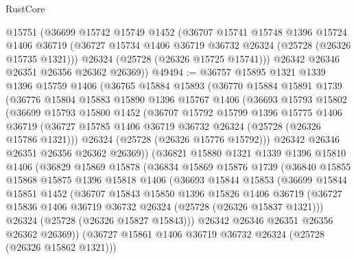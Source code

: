 \begin{lexlean}{RustCore}
\begin{coremodule}
      @15751
      (@36699
        @15742
        @15749
        @1452
        (@36707
          @15741
          @15748
          @1396
          @15724
          @1406
          @36719
          (@36727 @15734 @1406 @36719 @36732 @26324 (@25728 (@26326 @15735 @1321)))
          @26324
          (@25728 (@26326 @15725 @15741)))
        @26342
        @26346
        @26351
        @26356
        @26362
        @26369))
@49494 := @36757
    @15895
    @1321
    @1339
    @1396
    @15759
    @1406
    (@36765
      @15884
      @15893
      (@36770
        @15884
        @15891
        @1739
        (@36776
          @15804
          @15883
          @15890
          @1396
          @15767
          @1406
          (@36693
            @15793
            @15802
            (@36699
              @15793
              @15800
              @1452
              (@36707
                @15792
                @15799
                @1396
                @15775
                @1406
                @36719
                (@36727 @15785 @1406 @36719 @36732 @26324 (@25728 (@26326 @15786 @1321)))
                @26324
                (@25728 (@26326 @15776 @15792)))
              @26342
              @26346
              @26351
              @26356
              @26362
              @26369))
          (@36821
            @15880
            @1321
            @1339
            @1396
            @15810
            @1406
            (@36829
              @15869
              @15878
              (@36834
                @15869
                @15876
                @1739
                (@36840
                  @15855
                  @15868
                  @15875
                  @1396
                  @15818
                  @1406
                  (@36693
                    @15844
                    @15853
                    (@36699
                      @15844
                      @15851
                      @1452
                      (@36707
                        @15843
                        @15850
                        @1396
                        @15826
                        @1406
                        @36719
                        (@36727 @15836 @1406 @36719 @36732 @26324 (@25728 (@26326 @15837 @1321)))
                        @26324
                        (@25728 (@26326 @15827 @15843)))
                      @26342
                      @26346
                      @26351
                      @26356
                      @26362
                      @26369))
                  (@36727 @15861 @1406 @36719 @36732 @26324 (@25728 (@26326 @15862 @1321)))

\end{coremodule}
\end{lexlean}
